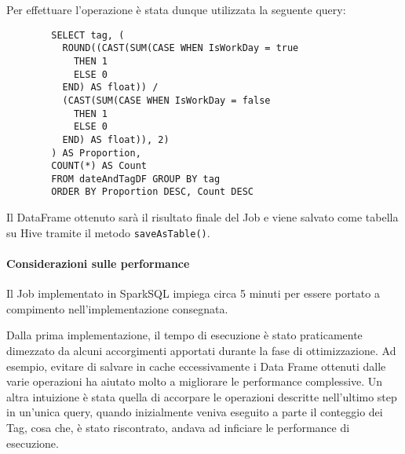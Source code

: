 \begin{itemize}
      Per effettuare l'operazione è stata dunque utilizzata la seguente query:

      \begin{verbatim}
        SELECT tag, (
          ROUND((CAST(SUM(CASE WHEN IsWorkDay = true
            THEN 1
            ELSE 0
          END) AS float)) /
          (CAST(SUM(CASE WHEN IsWorkDay = false
            THEN 1
            ELSE 0
          END) AS float)), 2)
        ) AS Proportion,
        COUNT(*) AS Count
        FROM dateAndTagDF GROUP BY tag
        ORDER BY Proportion DESC, Count DESC
      \end{verbatim}

    Il DataFrame ottenuto sarà il risultato finale del Job
    e viene salvato come tabella su Hive tramite il metodo \texttt{saveAsTable()}.
  \end{itemize}

  \paragraph{Considerazioni sulle performance}\label{par:job1:spark:performance}

  Il Job implementato in SparkSQL impiega circa 5 minuti per essere portato a compimento nell'implementazione consegnata.

  Dalla prima implementazione, il tempo di esecuzione è stato praticamente dimezzato da alcuni accorgimenti apportati durante la fase di ottimizzazione.
  Ad esempio, evitare di salvare in cache eccessivamente i Data Frame ottenuti dalle varie operazioni ha aiutato molto a migliorare le performance complessive.
  Un altra intuizione è stata quella di accorpare le operazioni descritte nell'ultimo step in un'unica query, quando inizialmente
  veniva eseguito a parte il conteggio dei Tag, cosa che, è stato riscontrato, andava ad inficiare le performance di esecuzione.
